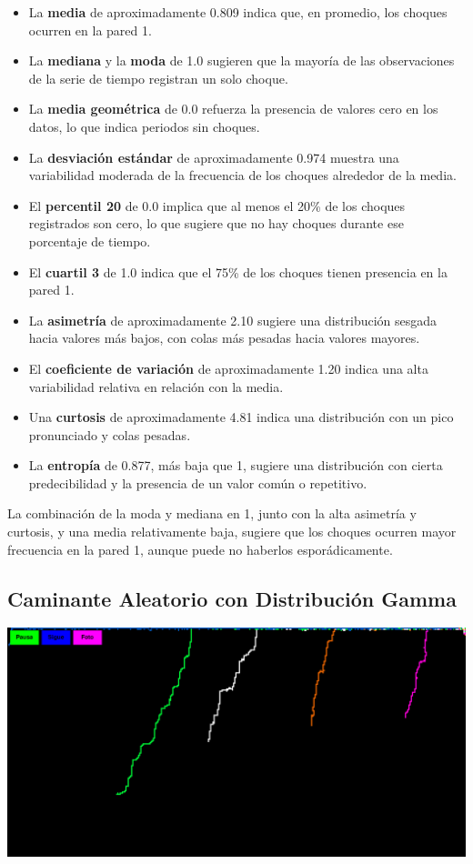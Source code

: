 \documentclass[11pt]{article} %
\begin{document}
	 \begin{itemize}
	 	\item La \textbf{media} de aproximadamente 0.809 indica que, en promedio, los choques ocurren en la pared 1.
	 	\item La \textbf{mediana} y la \textbf{moda} de 1.0 sugieren que la mayoría de las observaciones de la serie de tiempo registran un solo choque.
	 	\item La \textbf{media geométrica} de 0.0 refuerza la presencia de valores cero en los datos, lo que indica periodos sin choques.
	 	\item La \textbf{desviación estándar} de aproximadamente 0.974 muestra una variabilidad moderada de la frecuencia de los choques alrededor de la media.
	 	\item El \textbf{percentil 20} de 0.0 implica que al menos el 20\% de los choques registrados son cero, lo que sugiere que no hay choques durante ese porcentaje de tiempo.
	 	\item El \textbf{cuartil 3} de 1.0 indica que el 75\% de los choques tienen presencia en la pared 1.
	 	\item La \textbf{asimetría} de aproximadamente 2.10 sugiere una distribución sesgada hacia valores más bajos, con colas más pesadas hacia valores mayores.
	 	\item El \textbf{coeficiente de variación} de aproximadamente 1.20 indica una alta variabilidad relativa en relación con la media.
	 	\item Una \textbf{curtosis} de aproximadamente 4.81 indica una distribución con un pico pronunciado y colas pesadas.
	 	\item La \textbf{entropía} de 0.877, más baja que 1, sugiere una distribución con cierta predecibilidad y la presencia de un valor común o repetitivo.
	 \end{itemize}
	 
	 La combinación de la moda y mediana en 1, junto con la alta asimetría y curtosis, y una media relativamente baja, sugiere que los choques ocurren mayor frecuencia en la pared 1, aunque puede no haberlos esporádicamente.
	
	
	
	\newpage	
	\subsection{Caminante Aleatorio con Distribución Gamma}
	\begin{center}
		\includegraphics[width=0.7\linewidth]{walkerGamma.png}
		\label{walkerGamma}
	\end{center}
	
\end{document}
